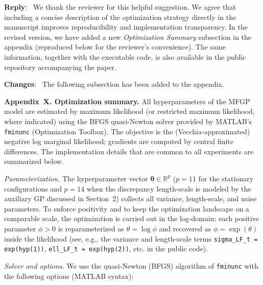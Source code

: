 \documentclass[12pt]{article}
\newcommand{\bs}{\boldsymbol}
\newcommand{\0}{\mathbf{0}}
\newcounter{reviewer}
\newenvironment{reply}
   {\medskip \noindent \begin{sf}\color{Blue}\textbf{Reply}:\  }
   {\medskip \end{sf}}
\newenvironment{changes}
   {\medskip \noindent \begin{sf}\color{ForestGreen}\textbf{Changes}:\  }
   {\medskip \end{sf}}
\begin{document}
\begin{reply}
We thank the reviewer for this helpful suggestion. We agree that including a concise description of the optimization strategy directly in the manuscript improves reproducibility and implementation transparency. In the revised version, we have added a new \emph{Optimization Summary} subsection in the appendix (reproduced below for the reviewer's convenience). The same information, together with the executable code, is also available in the public repository accompanying the paper.
\end{reply}

\begin{changes}
The following subsection has been added to the appendix.

\medskip
\noindent\textbf{Appendix~X. Optimization summary.}
All hyperparameters of the MFGP model are estimated by maximum likelihood (or restricted maximum likelihood, where indicated) using the BFGS quasi-Newton solver provided by MATLAB's \texttt{fminunc} (Optimization Toolbox). The objective is the (Vecchia-approximated) negative log marginal likelihood; gradients are computed by central finite differences. The implementation details that are common to all experiments are summarized below.

\smallskip
\noindent\textit{Parameterization.} The hyperparameter vector $\bs{\theta}\in\mathbb{R}^{p}$ ($p=11$ for the stationary configurations and $p=14$ when the discrepancy length-scale is modeled by the auxiliary GP discussed in Section~2) collects all variance, length-scale, and noise parameters. To enforce positivity and to keep the optimization landscape on a comparable scale, the optimization is carried out in the log-domain: each positive parameter $\phi>0$ is reparameterized as $\theta=\log\phi$ and recovered as $\phi=\exp(\theta)$ inside the likelihood (see, e.g., the variance and length-scale terms \mbox{\texttt{sigma\_LF\_t = exp(hyp(1))}}, \mbox{\texttt{ell\_LF\_t = exp(hyp(2))}}, etc. in the public code).

\smallskip
\noindent\textit{Solver and options.} We use the quasi-Newton (BFGS) algorithm of \texttt{fminunc} with the following options (MATLAB syntax):


\end{changes}
\end{document}
